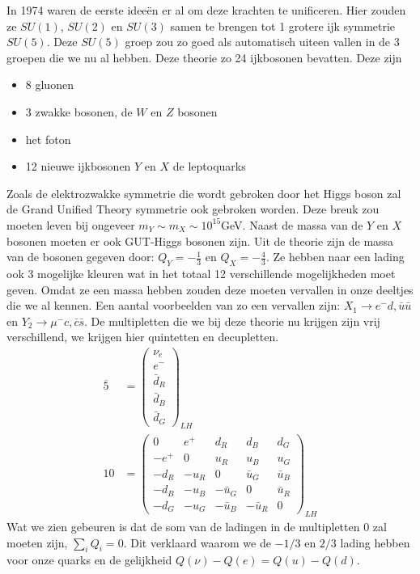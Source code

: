 \documentclass[../main.tex]{subfiles}
\begin{document}
In 1974 waren de eerste ideeën er al om deze krachten te unificeren. Hier zouden ze $SU(1)$, $SU(2)$ en $SU(3)$ samen te brengen tot 1 grotere ijk symmetrie $SU(5)$. Deze $SU(5)$ groep zou zo goed als automatisch uiteen vallen in de 3 groepen die we nu al hebben. Deze theorie zo 24 ijkbosonen bevatten. Deze zijn
\begin{itemize}
    \item 8 gluonen
    \item 3 zwakke bosonen, de $W$ en $Z$ bosonen
    \item het foton
    \item 12 nieuwe ijkbosonen $Y$ en $X$ de leptoquarks
\end{itemize}
Zoals de elektrozwakke symmetrie die wordt gebroken door het Higgs boson zal de Grand Unified Theory symmetrie ook gebroken worden. Deze breuk zou moeten leven bij ongeveer $m_{Y} \sim m_{X} \sim 10^{15}$GeV. Naast de massa van de $Y$ en $X$ bosonen moeten er ook GUT-Higgs bosonen zijn. Uit de theorie zijn de massa van de bosonen gegeven door: $Q_{Y}=-\frac{1}{3}$ en $Q_{X}=-\frac{4}{3}$. Ze hebben naar een lading ook 3 mogelijke kleuren wat in het totaal 12 verschillende mogelijkheden moet geven. Omdat ze een massa hebben zouden deze moeten vervallen in onze deeltjes die we al kennen. Een aantal voorbeelden van zo een vervallen zijn: $X_{1} \rightarrow e^{-} d, \bar{u} \bar{u}$ en $Y_{2} \rightarrow \mu^{-} c, \bar{c} \bar{s}$. De multipletten die we bij deze theorie nu krijgen zijn vrij verschillend, we krijgen hier quintetten en decupletten.
\begin{equation}
    \begin{aligned}
        \label{eq:qut_multipletten}
        \overline{5}&=\left(\begin{array}{c}
                \nu_{e} \\
                e^{-} \\
                \bar{d}_{R} \\
                \bar{d}_{B} \\
                \bar{d}_{G}
        \end{array}\right)_{L H}\\
        10&=\left(\begin{array}{ccccc}
                0 & e^{+} & d_{R} & d_{B} & d_{G} \\
                -e^{+} & 0 & u_{R} & u_{B} & u_{G} \\
                -d_{R} & -u_{R} & 0 & \bar{u}_{G} & \bar{u}_{B} \\
                -d_{B} & -u_{B} & -\bar{u}_{G} & 0 & \bar{u}_{R} \\
                -d_{G} & -u_{G} & -\bar{u}_{B} & -\bar{u}_{R} & 0
        \end{array}\right)_{L H}
    \end{aligned}
\end{equation}
Wat we zien gebeuren is dat de som van de ladingen in de multipletten 0 zal moeten zijn, $\sum_{i} Q_{i}=0$. Dit verklaard waarom we de $-1/3$ en $2/3$ lading hebben voor onze quarks en de gelijkheid $Q(\nu)-Q(e)=Q(u)-Q(d)$.
\end{document}

